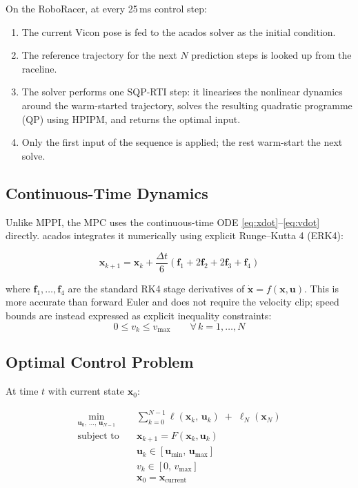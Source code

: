 \documentclass[11pt]{article}
\begin{document}
On the RoboRacer, at every 25\,ms control step:
\begin{enumerate}
  \item The current Vicon pose is fed to the acados solver as the initial condition.
  \item The reference trajectory for the next $N$ prediction steps is looked up from
        the raceline.
  \item The solver performs one SQP-RTI step: it linearises the nonlinear dynamics
        around the warm-started trajectory, solves the resulting quadratic programme
        (QP) using HPIPM, and returns the optimal input.
  \item Only the first input of the sequence is applied; the rest warm-start the
        next solve.
\end{enumerate}

\subsection{Continuous-Time Dynamics}

Unlike MPPI, the MPC uses the continuous-time ODE \eqref{eq:xdot}--\eqref{eq:vdot}
directly. acados integrates it numerically using explicit Runge--Kutta 4 (ERK4):

\[
\bm{x}_{k+1} = \bm{x}_k + \frac{\Delta t}{6}
  \left(\bm{f}_1 + 2\bm{f}_2 + 2\bm{f}_3 + \bm{f}_4\right)
\]

where $\bm{f}_1, \dots, \bm{f}_4$ are the standard RK4 stage derivatives of
$\dot{\bm{x}} = f(\bm{x}, \bm{u})$.  This is more accurate than forward Euler
and does not require the velocity $\mathrm{clip}$; speed bounds are instead
expressed as explicit inequality constraints:
\[
0 \leq v_k \leq v_{\max} \qquad \forall\, k = 1, \dots, N
\]

\subsection{Optimal Control Problem}

At time $t$ with current state $\bm{x}_0$:

\begin{align}
\min_{\bm{u}_0,\,\dots,\,\bm{u}_{N-1}} \quad
  &\sum_{k=0}^{N-1} \ell(\bm{x}_k,\, \bm{u}_k)
  \;+\; \ell_N(\bm{x}_N) \label{eq:ocp}\\
\text{subject to} \quad
  &\bm{x}_{k+1} = F(\bm{x}_k, \bm{u}_k) \tag{dynamics}\\
  &\bm{u}_k \in [\bm{u}_{\min},\, \bm{u}_{\max}] \tag{input bounds}\\
  &v_k \in [0,\, v_{\max}] \tag{speed bound}\\
  &\bm{x}_0 = \bm{x}_{\text{current}} \tag{initial condition}
\end{align}
\end{document}
